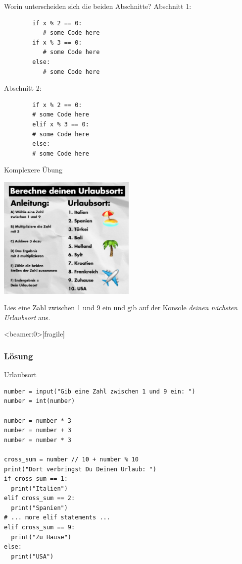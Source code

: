\begin{fragile}[Übung]
	\begin{block}{Worin unterscheiden sich die beiden Abschnitte?}
		\vspace{5pt}
		Abschnitt 1: 
		\begin{verbatim}
		if x % 2 == 0: 
		   # some Code here
		if x % 3 == 0: 
		   # some Code here
		else: 
		   # some Code here  
		\end{verbatim}
		Abschnitt 2: 
		\begin{verbatim}
		if x % 2 == 0: 
		# some Code here
		elif x % 3 == 0: 
		# some Code here
		else: 
		# some Code here  
		\end{verbatim}
	\end{block}
\end{fragile}


\begin{frame}{Komplexere Übung}
\begin{center}
\includegraphics[width=0.5\textwidth]{urlaubsort.png}
\end{center}
Lies eine Zahl zwischen 1 und 9 ein und gib auf der Konsole \emph{deinen nächsten Urlaubsort} aus. 
\end{frame}


\begin{frame}<beamer:0>[fragile]
\frametitle{Lösung}
\begin{solutionblock}{Urlaubsort}
\begin{verbatim}
number = input("Gib eine Zahl zwischen 1 und 9 ein: ")
number = int(number)

number = number * 3
number = number + 3
number = number * 3

cross_sum = number // 10 + number % 10
print("Dort verbringst Du Deinen Urlaub: ")
if cross_sum == 1:
  print("Italien")
elif cross_sum == 2:
  print("Spanien")
# ... more elif statements ... 
elif cross_sum == 9:
  print("Zu Hause")
else:
  print("USA")
\end{verbatim}
\end{solutionblock}
\end{frame}



